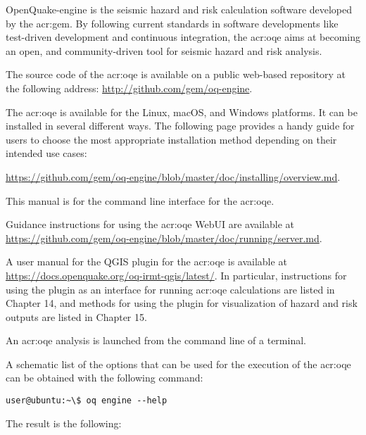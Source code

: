 OpenQuake-engine is the seismic hazard and risk calculation software developed by
the \glsdesc{acr:gem}. By following current standards in software
developments like test-driven development and continuous integration, the
\glsdesc{acr:oqe} aims at becoming an open, and community-driven tool for
seismic hazard and risk analysis.

The source code of the \glsdesc{acr:oqe} is available on a public web-based
repository at the following address:
\href{http://github.com/gem/oq-engine}{http://github.com/gem/oq-engine}.

The \glsdesc{acr:oqe} is available for the Linux, macOS, and Windows
platforms. It can be installed in several different ways. The following page
provides a handy guide for users to choose the most appropriate installation
method depending on their intended use cases:

\href{https://github.com/gem/oq-engine/blob/master/doc/installing/overview.md}{https://github.com/gem/oq-engine/blob/master/doc/installing/overview.md}.

This manual is for the command line interface for the \glsdesc{acr:oqe}. 

Guidance instructions for using the \glsdesc{acr:oqe} WebUI are available 
at \href{https://github.com/gem/oq-engine/blob/master/doc/running/server.md}{https://github.com/gem/oq-engine/blob/master/doc/running/server.md}.

A user manual for the QGIS plugin for the \glsdesc{acr:oqe} is available at 
\href{https://docs.openquake.org/oq-irmt-qgis/latest/}{https://docs.openquake.org/oq-irmt-qgis/latest/}. 
In particular, instructions for using the plugin as an interface for running \glsdesc{acr:oqe}
calculations are listed in Chapter 14, and methods for using the plugin for visualization 
of hazard and risk outputs are listed in Chapter 15.

An \gls{acr:oqe} analysis is launched from the command line of a terminal.

A schematic list of the options that can be used for the execution of the
\gls{acr:oqe} can be obtained with the following command:

\begin{verbatim}
user@ubuntu:~\$ oq engine --help
\end{verbatim}

The result is the following:
\inputminted[firstline=1,fontsize=\footnotesize,frame=single]{shell-session}{oqum/help.txt}
